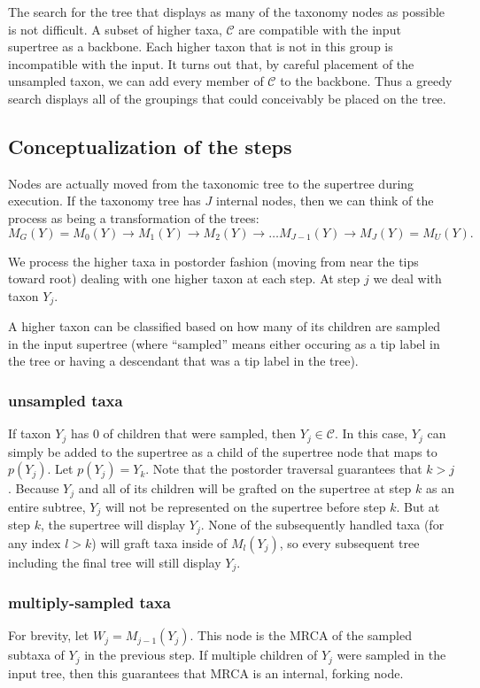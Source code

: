 \documentclass[english]{article}
\newcommand{\parent}[1]{p(#1)}
\begin{document}
The search for the tree that displays as many of the taxonomy nodes as possible is not difficult.
A subset of higher taxa, $\mathcal{C}$ are compatible with the input supertree as a backbone.
Each higher taxon that is not in this group is incompatible with the input.
It turns out that, by careful placement of the unsampled taxon, we can add every 
    member of $\mathcal{C}$ to the backbone.
Thus a greedy search displays all of the groupings that could conceivably be placed on the tree.

\subsection{Conceptualization of the steps}
Nodes are actually moved from the taxonomic tree to the supertree during execution.
If the taxonomy tree has $J$ internal nodes, then we can think of the process as being
a transformation of the trees:
\[M_G(Y) = M_0(Y) \rightarrow M_1(Y) \rightarrow M_2(Y) \rightarrow \ldots M_{J-1}(Y) \rightarrow M_J(Y) = M_U(Y).\]

We process the higher taxa in postorder fashion (moving from near the tips toward root) dealing with one higher taxon at each step.
At step $j$ we deal with taxon $Y_j$.

A higher taxon can be classified based on how many of its children are
sampled in the input supertree (where ``sampled'' means either occuring as a tip label in the tree or having a descendant that was a tip label in the tree).

\subsubsection{unsampled taxa}
If taxon $Y_j$ has 0 of children that were sampled, then $Y_j\in \mathcal{C}$.
In this case, $Y_j$ can simply be added to the supertree as a child of the supertree node that maps to $\parent{Y_j}$.
Let $\parent{Y_j} = Y_k$.
Note that the postorder traversal guarantees that $k > j$.
Because $Y_j$ and all of its children will be grafted on the supertree at step $k$ as
an entire subtree, $Y_j$ will not be represented on the supertree before step $k$.
But at step $k$, the supertree will display $Y_j$.
None of the subsequently handled taxa (for any index $l> k$) will 
graft taxa inside of $M_l(Y_j)$, so every subsequent tree including the
final tree will still display $Y_j$.

\subsubsection{multiply-sampled taxa}
For brevity, let $W_j = M_{j-1}(Y_j)$.
This node is the MRCA of the sampled subtaxa of $Y_j$ in the previous step.
If multiple children of $Y_j$ were sampled in the input tree, then this guarantees that MRCA is an internal, forking node.
\end{document}
